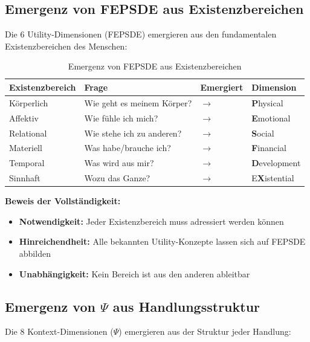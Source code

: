 \subsection{Emergenz von FEPSDE aus Existenzbereichen}
\label{sec:17-fepsde-emergence}

Die 6 Utility-Dimensionen (FEPSDE) emergieren aus den fundamentalen Existenzbereichen des Menschen:

\begin{table}[htbp]
\centering
\caption{Emergenz von FEPSDE aus Existenzbereichen}
\label{tab:17-fepsde-emergence}
\renewcommand{\arraystretch}{1.3}
\begin{tabular}{@{}llll@{}}
\toprule
\textbf{Existenzbereich} & \textbf{Frage} & \textbf{Emergiert} & \textbf{Dimension} \\
\midrule
K\"{o}rperlich & Wie geht es meinem K\"{o}rper? & $\rightarrow$ & \textbf{P}hysical \\
Affektiv & Wie f\"{u}hle ich mich? & $\rightarrow$ & \textbf{E}motional \\
Relational & Wie stehe ich zu anderen? & $\rightarrow$ & \textbf{S}ocial \\
Materiell & Was habe/brauche ich? & $\rightarrow$ & \textbf{F}inancial \\
Temporal & Was wird aus mir? & $\rightarrow$ & \textbf{D}evelopment \\
Sinnhaft & Wozu das Ganze? & $\rightarrow$ & E\textbf{X}istential \\
\bottomrule
\end{tabular}
\end{table}

\textbf{Beweis der Vollst\"{a}ndigkeit:}
\begin{itemize}[nosep]
\item \textbf{Notwendigkeit:} Jeder Existenzbereich muss adressiert werden k\"{o}nnen
\item \textbf{Hinreichendheit:} Alle bekannten Utility-Konzepte lassen sich auf FEPSDE abbilden
\item \textbf{Unabh\"{a}ngigkeit:} Kein Bereich ist aus den anderen ableitbar
\end{itemize}

\subsection{Emergenz von $\Psi$ aus Handlungsstruktur}
\label{sec:17-psi-emergence}

Die 8 Kontext-Dimensionen ($\Psi$) emergieren aus der Struktur jeder Handlung:

